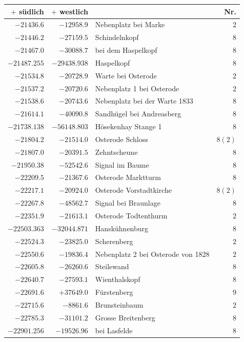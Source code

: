 \clearpage{}%
\begin{center}\begingroup\fontsize{8}{9}\selectfont
\setlength{\tabcolsep}{4pt}
\begin{tabular}{r|r|p{170pt}|r}\hline
\(+\) südlich&\(+\) westlich&&Nr.\\\hline
\(-21436.6\)&\(-12958.9\)&Nebenplatz bei Marke&\(2\)\\
\(-21446.2\)&\(-27159.5\)&Schindelnkopf&\(8\)\\
\(-21467.0\)&\(-30088.7\)&bei dem Haspelkopf&\(8\)\\
\(-21487.255\)&\(-29438.938\)&Haspelkopf&\(8\)\\
\(-21534.8\)&\(-20728.9\)&Warte bei Osterode&\(2\)\\
\(-21537.2\)&\(-20720.6\)&Nebenplatz 1 bei Osterode&\(2\)\\
\(-21538.6\)&\(-20743.6\)&Nebenplatz bei der Warte 1833&\(8\)\\
\(-21614.1\)&\(-40090.8\)&Sandhügel bei Andreasberg&\(8\)\\
\(-21738.138\)&\(-56148.803\)&Hösekenhay Stange 1&\(8\)\\
\(-21804.2\)&\(-21514.0\)&Osterode Schloss&\(8 (2)\)\\
\(-21807.0\)&\(-20391.5\)&Zehntscheune&\(8\)\\
\(-21950.38\)&\(-52542.6\)&Signal im Baume&\(8\)\\
\(-22209.5\)&\(-21367.6\)&Osterode Marktturm&\(8\)\\
\(-22217.1\)&\(-20924.0\)&Osterode Vorstadtkirche&\(8 (2)\)\\
\(-22267.8\)&\(-48562.7\)&Signal bei Braunlage&\(8\)\\
\(-22351.9\)&\(-21613.1\)&Osterode Todtenthurm&\(2\)\\
\(-22503.363\)&\(-32044.871\)&Hanskühnenburg&\(8\)\\
\(-22524.3\)&\(-23825.0\)&Scherenberg&\(2\)\\
\(-22550.6\)&\(-19836.4\)&Nebenplatz 2 bei Osterode von 1828&\(2\)\\
\(-22605.8\)&\(-26260.6\)&Steilewand&\(8\)\\
\(-22640.7\)&\(-27593.1\)&Wienthalskopf&\(8\)\\
\(-22691.6\)&\(+37649.0\)&Fürstenberg&\(9\)\\
\(-22715.6\)&\(-8861.6\)&Brunsteinbaum&\(2\)\\
\(-22785.3\)&\(-31101.2\)&Grosse Breitenberg&\(8\)\\
\(-22901.256\)&\(-19526.96\)&bei Lasfelde&\(8\)\\

\end{tabular}
\end{center}
